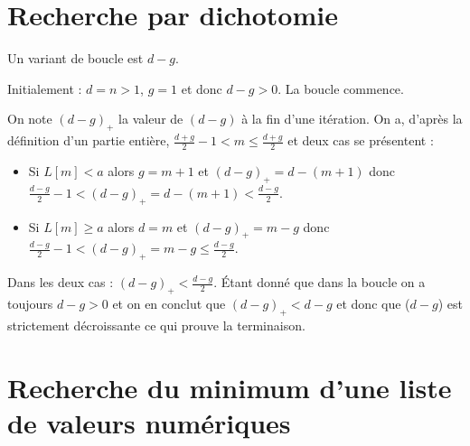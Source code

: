 \section{Recherche par dichotomie}

Un variant de boucle est $d-g$. 

Initialement : $d=n>1$, $g=1$ et donc $d-g>0$. La boucle commence.

On note $(d-g)_+$ la valeur de $(d-g)$ à la fin d'une itération. On a, d'après la définition d'un partie entière, $\frac{d+g}{2} - 1 < m \leq \frac{d+g}{2}$ et deux cas se présentent :
\begin{itemize}
 \item Si $L[m]<a$ alors $g=m+1$ et $(d-g)_+ = d - (m+1)$ donc $\frac{d-g}{2} - 1 < (d-g)_+ = d - (m+1) < \frac{d-g}{2}$.
 
 \item Si $L[m] \geq a$ alors $d=m$ et $(d-g)_+ = m - g$ donc  $\frac{d-g}{2} - 1 < (d-g)_+ = m - g \leq \frac{d-g}{2}$.
\end{itemize}

Dans les deux cas : $(d-g)_+ < \frac{d-g}{2}$. Étant donné que dans la boucle on a toujours $d-g>0$ et on en conclut que $(d-g)_+ < d-g$ et donc que ($d-g$) est strictement décroissante ce qui prouve la terminaison. 

\section{Recherche du minimum d'une liste de valeurs numériques}

